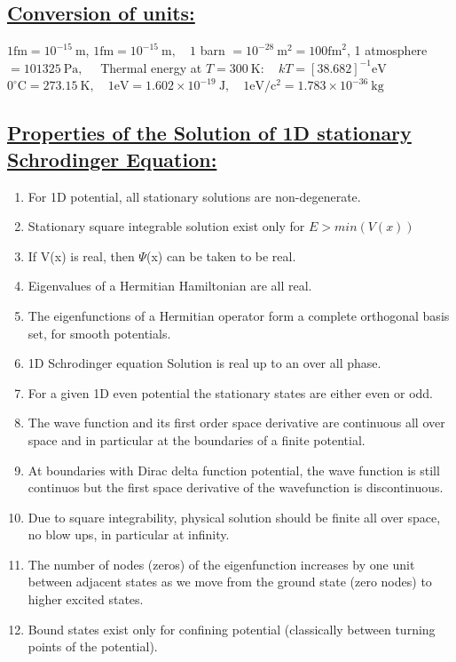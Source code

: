 \documentclass[a4paper,12pt]{article}
\begin{document}
\subsection*{\underline{Conversion of units:}}
$1 \mathrm{fm}=10^{-15} \mathrm{~m}$, $1 \mathrm{fm}=10^{-15} \mathrm{~m}, \quad 1$ barn $=10^{-28} \mathrm{~m}^{2}=100 \mathrm{fm}^{2}$, 1 atmosphere $=101325 \mathrm{~Pa}, \quad$ Thermal energy at $T=300 \mathrm{~K}: \quad k T=[38.682]^{-1} \mathrm{eV}$ $0^{\circ} \mathrm{C}=273.15 \mathrm{~K}, \quad 1 \mathrm{eV}=1.602 \times 10^{-19} \mathrm{~J}, \quad 1 \mathrm{eV} / \mathrm{c}^{2}=1.783 \times 10^{-36} \mathrm{~kg}$

\subsection*{\underline{Properties of the Solution of 1D stationary Schrodinger Equation:}}
\begin{enumerate}
    \item For 1D potential, all stationary solutions are non-degenerate.
    \item Stationary square integrable solution exist only for $E > min{(V(x))}$
    \item If V(x) is real, then $\Psi$(x) can be taken to be real.
    \item Eigenvalues of a Hermitian Hamiltonian are all real.
    \item The eigenfunctions of a Hermitian operator form a complete orthogonal basis set, for smooth potentials.
    \item 1D Schrodinger equation Solution is real up to an over all phase.
    \item For a given 1D even potential the stationary states are either even or odd.
    \item The wave function and its first order space derivative are continuous all over space and in particular at the boundaries of a finite potential.
    \item At boundaries with Dirac delta function potential,
          the wave function is still continuos but the first space derivative of the wavefunction is discontinuous. 
    \item Due to square integrability, physical solution should be finite all over space, no blow ups, in particular at infinity.
    \item The number of nodes (zeros) of the eigenfunction increases by one unit between adjacent states as we move from the ground state (zero nodes) to higher excited states.
    \item Bound states exist only for confining potential (classically between turning points of the potential).
\end{enumerate}
\end{document}
